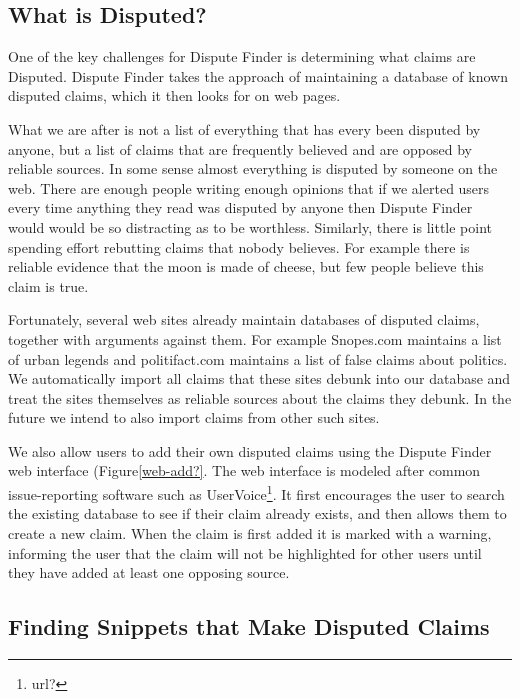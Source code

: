\documentclass{www2010-submission}
\newcommand{\todo}[1]{}
\begin{document}
\subsection{What is Disputed?}

One of the key challenges for Dispute Finder is determining what claims are Disputed. Dispute Finder takes the approach of maintaining a database of known disputed claims, which it then looks for on web pages.

What we are after is not a list of everything that has every been disputed by anyone, but a list of claims that are frequently believed and are opposed by reliable sources. In some sense almost everything is disputed by someone on the web. There are enough people writing enough opinions that if we alerted users every time anything they read was disputed by anyone then Dispute Finder would would be so distracting as to be worthless. Similarly, there is little point spending effort rebutting claims that nobody believes. For example there is reliable evidence that the moon is made of cheese, but few people believe this claim is true.

Fortunately, several web sites already maintain databases of disputed claims, together with arguments against them. For example Snopes.com maintains a list of urban legends and politifact.com maintains a list of false claims about politics. We automatically import all claims that these sites debunk into our database and treat the sites themselves as reliable sources about the claims they debunk. In the future we intend to also import claims from other such sites.

We also allow users to add their own disputed claims using the Dispute Finder web interface (Figure\ref{web-add?}. The web interface is modeled after common issue-reporting software such as UserVoice\footnote{url?}. It first encourages the user to search the existing database to see if their claim already exists, and then allows them to create a new claim. When the claim is first added it is marked with a warning, informing the user that the claim will not be highlighted for other users until they have added at least one opposing source.


\subsection{Finding Snippets that Make Disputed Claims}

\todo{Do a load more people in a final user-study round. Try to get it up to 8.}
\end{document}
